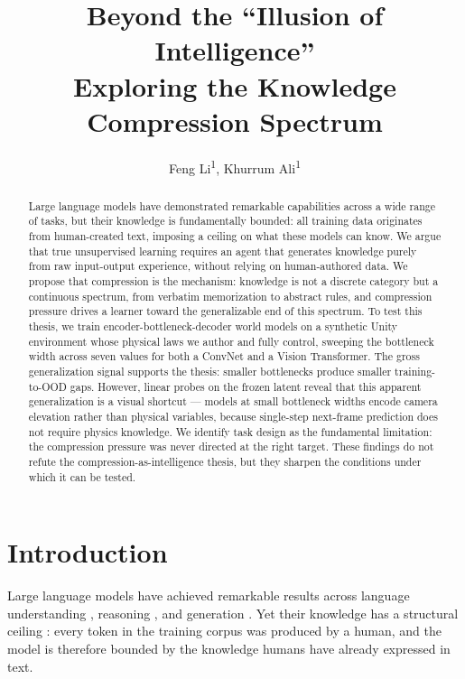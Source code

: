\documentclass[letterpaper]{article} %
\title{Beyond the ``Illusion of Intelligence'' \\Exploring the Knowledge Compression Spectrum}
\author{
    Feng Li\textsuperscript{\rm 1},
    Khurrum Ali\textsuperscript{\rm 1}
}
\begin{document}
\maketitle

\begin{abstract}
  Large language models have demonstrated remarkable capabilities across a wide range of tasks, but their knowledge is fundamentally bounded: all training data originates from human-created text, imposing a ceiling on what these models can know. We argue that true unsupervised learning requires an agent that generates knowledge purely from raw input-output experience, without relying on human-authored data.
  We propose that compression is the mechanism: knowledge is not a discrete category but a continuous spectrum, from verbatim memorization to abstract rules, and compression pressure drives a learner toward the generalizable end of this spectrum.
  To test this thesis, we train encoder-bottleneck-decoder world models on a synthetic Unity environment whose physical laws we author and fully control, sweeping the bottleneck width across seven values for both a ConvNet and a Vision Transformer.
  The gross generalization signal supports the thesis: smaller bottlenecks produce smaller training-to-OOD gaps. However, linear probes on the frozen latent reveal that this apparent generalization is a visual shortcut --- models at small bottleneck widths encode camera elevation rather than physical variables, because single-step next-frame prediction does not require physics knowledge.
  We identify task design as the fundamental limitation: the compression pressure was never directed at the right target. These findings do not refute the compression-as-intelligence thesis, but they sharpen the conditions under which it can be tested.
\end{abstract}

\section{Introduction}

Large language models have achieved remarkable results across language understanding \citep{hendrycks2021mmlu}, reasoning
\citep{wei2022chain}, and generation \citep{jiang2025survey}.
Yet their knowledge has a structural ceiling \citep{bender2021stochastic}: every token in the training corpus was produced by a human, and
the model is therefore bounded by the knowledge humans have already expressed in text.
\end{document}
